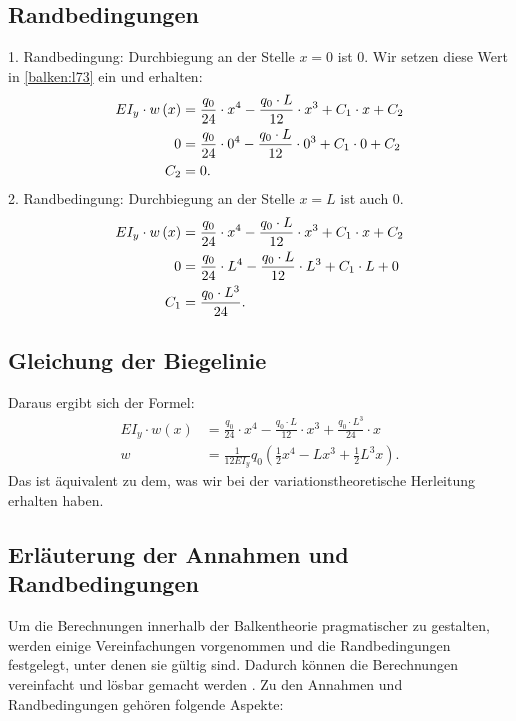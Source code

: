 \subsection{Randbedingungen}
1. Randbedingung: Durchbiegung an der Stelle $x = 0$ ist 0. Wir setzen diese Wert in
\eqref{balken:l73}
ein und erhalten:
\begin{align}
		EI_y\cdot w\left(x\right)&=
		\frac{q_0}{24}\cdot x^4-\frac{q_0\cdot L}{12}\cdot x^3+C_1\cdot x+C_2
\notag
	\\
		0&=
		\frac{q_0}{24}\cdot0^4-\frac{q_0\cdot L}{12}\cdot0^3+C_1\cdot0+C_2
\notag
	\\
		C_2&=0.
\notag
\end{align}
2. Randbedingung: Durchbiegung an der Stelle $x = L$ ist auch 0.
\begin{align}
		EI_y\cdot w\left(x\right)&=
		\frac{q_0}{24}\cdot x^4-\frac{q_0\cdot L}{12}\cdot x^3+C_1\cdot x+C_2
\notag
	\\
		0&=
		\frac{q_0}{24}\cdot L^4-\frac{q_0\cdot L}{12}\cdot L^3+C_1\cdot L+0
\notag
	\\
		C_1&=
		\frac{q_0\cdot L^3}{24}.
\notag
\end{align}

\subsection{Gleichung der Biegelinie}
Daraus ergibt sich der Formel:
\begin{align*}
		EI_y\cdot w\left(x\right)&=
		\frac{q_0}{24}\cdot x^4-\frac{q_0\cdot L}{12}\cdot x^3+\frac{q_0\cdot L^3}{24}\cdot x
	\\
		w&=
		\frac{1}{12EI_y}q_0\left(\frac{1}{2}x^4-Lx^3+\frac{1}{2}L^3x\right).
\end{align*}
Das ist äquivalent zu dem, was wir bei der variationstheoretische Herleitung erhalten haben.

\subsection{Erläuterung der Annahmen und Randbedingungen}
Um die Berechnungen innerhalb der Balkentheorie pragmatischer zu gestalten, werden einige Vereinfachungen vorgenommen und die Randbedingungen festgelegt, unter denen sie gültig sind.
Dadurch können die Berechnungen vereinfacht und lösbar gemacht werden \cite{balken:Differentialgleichung-der-Biegelinie}.
Zu den Annahmen und Randbedingungen gehören folgende Aspekte:

